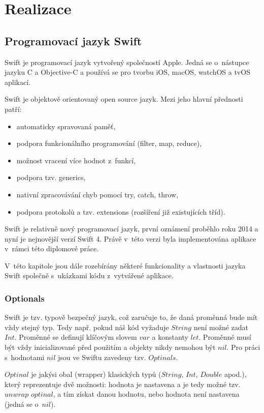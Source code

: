 \documentclass[thesis=M,czech]{FITthesis}[2012/06/26]
\begin{document}
\chapter{Realizace}
\label{chap:realizace}

\section{Programovací jazyk Swift}
Swift je programovací jazyk vytvořený společností Apple. Jedná se o~nástupce jazyku C a Objective-C a používá se pro tvorbu iOS, macOS, watchOS a tvOS aplikací.

Swift je objektově orientovaný open source jazyk. Mezi jeho hlavní přednosti patří: 
\begin{itemize}
\item automaticky spravovaná paměť,
\item podpora funkcionálního programování (filter, map, reduce),
\item možnost vracení  více  hodnot z~funkcí,
\item podpora tzv. generics,
\item nativní zpracovávání chyb pomocí try, catch, throw,
\item podpora protokolů a tzv. extensions (rozšíření již existujících tříd). \cite{swift}
\end{itemize}

Swift je relativně nový programovací jazyk, první oznámení proběhlo roku 2014 a nyní je nejnovější verzí Swift 4. Právě v~této verzi byla implementována aplikace v~rámci této diplomové práce. \cite{swift2}

V~této kapitole jsou dále rozebírány některé funkcionality a vlastnosti jazyka Swift společně s~ukázkami kódu z~vytvářené aplikace.

\subsection{Optionals}
Swift je tzv. typově bezpečný jazyk, což zaručuje to, že daná proměnná bude mít vždy stejný typ. Tedy např. pokud náš kód vyžaduje $String$ není možné zadat $Int$. 
Proměnné se definují klíčovým slovem $var$ a konstanty $let$. Proměnné musí být vždy inicializované před použitím a objekty nikdy nemohou být $nil$. Pro práci s~hodnotami $nil$ jsou ve Swiftu zavedeny tzv. $Optinals$.

$Optinal$ je jakýsi obal (wrapper) klasických typů ($String$, $Int$, $Double$ apod.), který reprezentuje dvě možnosti: hodnota je nastavena a je tedy možné tzv. $unwrap$ $optinal$, a tím získat danou hodnotu, nebo hodnota není nastavena (jedná se o~$nil$). \cite{devBasics}
\end{document}
